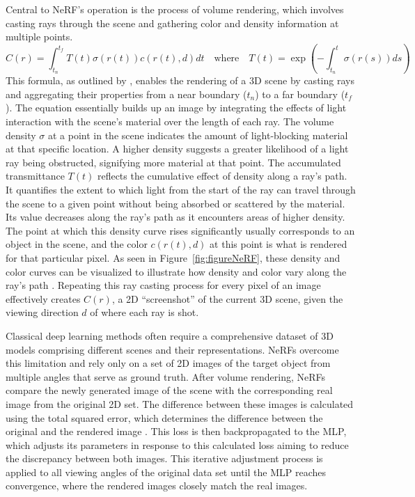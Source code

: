 Central to NeRF's operation is the process of volume rendering, which involves casting rays through the scene and gathering color and density information at multiple points.\[ 
C(r) = \int_{t_n}^{t_f} T(t)\sigma(r(t))c(r(t), d)dt \quad \text{where} \quad T(t) = \exp\left(-\int_{t_n}^t \sigma(r(s))ds\right) 
\] This formula, as outlined by \citeauthor{mildenhallNERF}, enables the rendering of a 3D scene by casting rays and aggregating their properties from a near boundary (\(t_n\)) to a far boundary (\(t_f\)). The equation essentially builds up an image by integrating the effects of light interaction with the scene's material over the length of each ray. The volume density \(\sigma\) at a point in the scene indicates the amount of light-blocking material at that specific location. A higher density suggests a greater likelihood of a light ray being obstructed, signifying more material at that point. The accumulated transmittance \( T(t) \) reflects the cumulative effect of density along a ray's path. It quantifies the extent to which light from the start of the ray can travel through the scene to a given point without being absorbed or scattered by the material. Its value decreases along the ray's path as it encounters areas of higher density. The point at which this density curve rises significantly usually corresponds to an object in the scene, and the color \( c(r(t), d) \) at this point is what is rendered for that particular pixel. As seen in Figure~\ref{fig:figureNeRF}, these density and color curves can be visualized to illustrate how density and color vary along the ray's path \citep{mildenhallNERF}. Repeating this ray casting process for every pixel of an image effectively creates \(C(r)\), a 2D ``screenshot'' of the current 3D scene, given the viewing direction \( d \) of where each ray is shot. 

Classical deep learning methods often require a comprehensive dataset of 3D models comprising different scenes and their representations. NeRFs overcome this limitation and rely only on a set of 2D images of the target object from multiple angles that serve as ground truth. After volume rendering, NeRFs compare the newly generated image of the scene with the corresponding real image from the original 2D set. The difference between these images is calculated using the total squared error, which determines the difference between the original and the rendered image \citep{mildenhallNERF}. This loss is then backpropagated to the MLP, which adjusts its parameters in response to this calculated loss aiming to reduce the discrepancy between both images. This iterative adjustment process is applied to all viewing angles of the original data set until the MLP reaches convergence, where the rendered images closely match the real images.

